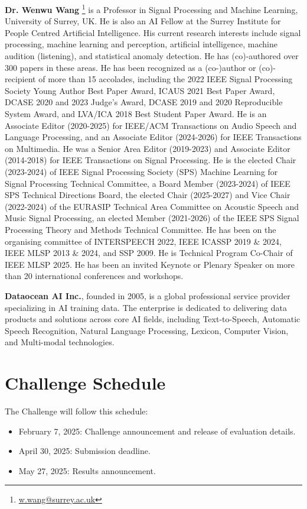 \documentclass{article}
\begin{document}
\textbf{Dr. Wenwu Wang} \footnote{\url{w.wang@surrey.ac.uk}} is a Professor in Signal Processing and Machine Learning, University of Surrey, UK. He is also an AI Fellow at the Surrey Institute for People Centred Artificial Intelligence. His current research interests include signal processing, machine learning and perception, artificial intelligence, machine audition (listening), and statistical anomaly detection. He has (co)-authored over 300 papers in these areas. He has been recognized as a (co-)author or (co)-recipient of more than 15 accolades, including the 2022 IEEE Signal Processing Society Young Author Best Paper Award, ICAUS 2021 Best Paper Award, DCASE 2020 and 2023 Judge’s Award, DCASE 2019 and 2020 Reproducible System Award, and LVA/ICA 2018 Best Student Paper Award. He is an Associate Editor (2020-2025) for IEEE/ACM Transactions on Audio Speech and Language Processing, and an Associate Editor (2024-2026) for IEEE Transactions on Multimedia. He was a Senior Area Editor (2019-2023) and Associate Editor (2014-2018) for IEEE Transactions on Signal Processing. He is the elected Chair (2023-2024) of IEEE Signal Processing Society (SPS) Machine Learning for Signal Processing Technical Committee, a Board Member (2023-2024) of IEEE SPS Technical Directions Board, the elected Chair (2025-2027) and Vice Chair (2022-2024) of the EURASIP Technical Area Committee on Acoustic Speech and Music Signal Processing, an elected Member (2021-2026) of the IEEE SPS Signal Processing Theory and Methods Technical Committee. He has been on the organising committee of INTERSPEECH 2022, IEEE ICASSP 2019 \& 2024, IEEE MLSP 2013 \& 2024, and SSP 2009. He is Technical Program Co-Chair of IEEE MLSP 2025. He has been an invited Keynote or Plenary Speaker on more than 20 international conferences and workshops.

\textbf{Dataocean AI Inc.}, founded in 2005, is a global professional service provider specializing in AI training data. The enterprise is dedicated to delivering data products and solutions across core AI fields, including Text-to-Speech, Automatic Speech Recognition, Natural Language Processing, Lexicon, Computer Vision, and Multi-modal technologies.


\section{Challenge Schedule}

The Challenge will follow this schedule:

\begin{itemize}[topsep=1ex]
\setlength{\parskip}{0pt}
    \item February 7, 2025: Challenge announcement and release of evaluation details.
    \item April 30, 2025: Submission deadline.
    \item May 27, 2025: Results announcement.
\end{itemize}
\end{document}
